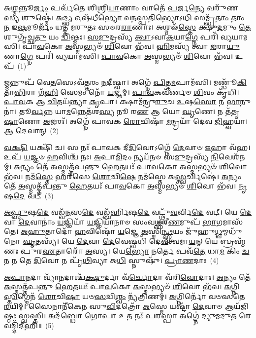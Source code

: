 \setcounter{anuvakam}{0}
𑌅\-\ul{𑌶𑍍𑌮}\-𑌨𑍍𑌨𑍂\-\ul{𑌰𑍍𑌜𑌂} 𑌪𑌰𑍍𑌵᳴𑌤𑍇 𑌶𑌿𑌶𑍍𑌰𑌿\-\ul{𑌯𑌾}\-𑌣𑌾𑌂 𑌵𑌾𑌤𑍇᳴ \ul{𑌪}\-𑌰𑍍𑌜\-\ul{𑌨𑍍𑌯𑍇} 𑌵𑌰𑍁᳴𑌣\-\ul{𑌸𑍍𑌯} 𑌶𑍁𑌷𑍍𑌮𑍇॑। \ul{𑌅}\-𑌦𑍍𑌭𑍍𑌯 𑌓𑌷᳴𑌧𑍀\-\ul{𑌭𑍍𑌯𑍋} 𑌵\-\ul{𑌨}\-𑌸𑍍𑌪\-\ul{𑌤𑌿}\-𑌭𑍍𑌯𑍋\-𑌽\-\ul{𑌧𑌿} 𑌸𑌮𑍍𑌭𑍃᳴\-\ul{𑌤𑌾𑌂} 𑌤𑌾𑌂 \ul{𑌨} 𑌇\-\ul{𑌷}\-𑌮𑍂𑌰𑍍𑌜𑌂᳴ 𑌧𑌤𑍍𑌤 𑌮𑌰𑍁𑌤𑌃 𑌸𑍞𑌰\-\ul{𑌰𑌾}\-𑌣𑌾𑌃। 𑌅𑌶𑍍𑌮𑍟᳴\-\ul{𑌸𑍍𑌤𑍇} 𑌕𑍍𑌷𑍁\-\ul{𑌦}\-𑌮𑍁𑌂 \ul{𑌤𑍇} 𑌶𑍁𑌗𑍃᳴𑌚𑍍𑌛\-\ul{𑌤𑍁} 𑌯𑌂 \ul{𑌦𑍍𑌵𑌿}\-𑌷𑍍𑌮𑌃। \ul{𑌸}\-\-\ul{𑌮𑍁}\-𑌦𑍍𑌰𑌸𑍍𑌯᳴ \ul{𑌤𑍍𑌵𑌾}\-\-𑌽𑌵𑌾\-\ul{𑌕}\-𑌯𑌾\-\ul{𑌗𑍍𑌨𑍇} 𑌪𑌰𑌿᳴ 𑌵𑍍𑌯𑌯𑌾𑌮𑌸𑌿। 𑌪𑌾\-\ul{𑌵}\-𑌕𑍋 \ul{𑌅}\-𑌸𑍍𑌮𑌭𑍍𑌯𑍞᳴ \ul{𑌶𑌿}\-𑌵𑍋 𑌭᳴𑌵। \ul{𑌹𑌿}\-𑌮𑌸𑍍𑌯᳴ 𑌤𑍍𑌵𑌾 \ul{𑌜}\-𑌰𑌾\-\ul{𑌯𑍁}\-𑌣𑌾\-\ul{𑌗𑍍𑌨𑍇} 𑌪𑌰𑌿᳴ 𑌵𑍍𑌯𑌯𑌾𑌮𑌸𑌿। \ul{𑌪𑌾}\-\-\ul{𑌵}\-𑌕𑍋 \ul{𑌅}\-𑌸𑍍𑌮𑌭𑍍𑌯𑍞᳴ \ul{𑌶𑌿}\-𑌵𑍋 𑌭᳴𑌵। 𑌉𑌪᳴~(1)

𑌜𑍍𑌮𑌨𑍍𑌨𑍁𑌪᳴ 𑌵𑍇\-\ul{𑌤}\-𑌸𑍇\-𑌽𑌵᳴𑌤𑍍𑌤𑌰𑌂 \ul{𑌨}\-𑌦𑍀𑌷𑍍𑌵𑌾। 𑌅𑌗𑍍𑌨𑍇᳴ \ul{𑌪𑌿}\-𑌤𑍍𑌤\-\ul{𑌮}\-𑌪𑌾𑌮᳴𑌸𑌿। 𑌮𑌣𑍍𑌡𑍂᳴\-\ul{𑌕𑌿} 𑌤𑌾\-\ul{𑌭𑌿}\-𑌰𑌾 𑌗᳴\-\ul{𑌹𑌿} 𑌸𑍇𑌮𑌂 𑌨𑍋᳴ \ul{𑌯}\-𑌜𑍍𑌞𑌮𑍍। \ul{𑌪𑌾}\-\-\ul{𑌵}\-𑌕𑌵᳴𑌰𑍍𑌣𑍞 \ul{𑌶𑌿}\-𑌵𑌂 𑌕𑍃᳴𑌧𑌿। \ul{𑌪𑌾}\-\-\ul{𑌵}\-𑌕 𑌆 \ul{𑌚𑌿}\-𑌤𑌯᳴𑌨𑍍𑌤𑍍𑌯𑌾 \ul{𑌕𑍃}\-𑌪𑌾। 𑌕𑍍𑌷𑌾𑌮᳴𑌨𑍍𑌰𑍁\-\ul{𑌰𑍁}\-𑌚 \ul{𑌉}\-𑌷\-\ul{𑌸𑍋} 𑌨 \ul{𑌭𑌾}\-𑌨𑍁𑌨𑌾॑। 𑌤𑍂\-\ul{𑌰𑍍𑌵}\-𑌨𑍍𑌨 𑌯𑌾\-\ul{𑌮}\-𑌨𑍍𑌨𑍇𑌤᳴𑌶\-\ul{𑌸𑍍𑌯} 𑌨𑍂 𑌰\-\ul{𑌣} 𑌆 𑌯𑍋 \ul{𑌘𑍃}\-𑌣𑍇। 𑌨 𑌤᳴𑌤𑍃\-\ul{𑌷𑌾}\-𑌣𑍋 \ul{𑌅}\-𑌜𑌰𑌃᳴। 𑌅𑌗𑍍𑌨𑍇᳴ 𑌪𑌾𑌵𑌕 \ul{𑌰𑍋}\-𑌚𑌿𑌷𑌾᳴ \ul{𑌮}\-𑌨𑍍𑌦𑍍𑌰𑌯𑌾᳴ 𑌦𑍇𑌵 \ul{𑌜𑌿}\-𑌹𑍍𑌵𑌯𑌾॑। 𑌆 \ul{𑌦𑍇}\-𑌵𑌾𑌨𑍍~(2)

\-\ul{𑌵}\-\-\ul{𑌕𑍍𑌷𑌿} 𑌯𑌕𑍍𑌷𑌿᳴ 𑌚। 𑌸 𑌨𑌃᳴ 𑌪𑌾𑌵𑌕 𑌦𑍀\-\ul{𑌦𑌿}\-𑌵𑍋\-𑌽𑌗𑍍𑌨𑍇᳴ \ul{𑌦𑍇}\-𑌵𑌾𑍞 \ul{𑌇}\-𑌹𑌾 𑌵᳴𑌹। 𑌉𑌪᳴ \ul{𑌯}\-𑌜𑍍𑌞𑍞 \ul{𑌹}\-𑌵𑌿𑌶𑍍𑌚᳴ 𑌨𑌃। \ul{𑌅}\-𑌪𑌾\-\ul{𑌮𑌿}\-𑌦𑌂 𑌨𑍍𑌯𑌯᳴𑌨𑍞 𑌸\-\ul{𑌮𑍁}\-𑌦𑍍𑌰𑌸𑍍𑌯᳴ \ul{𑌨𑌿}\-𑌵𑍇𑌶᳴𑌨𑌮𑍍। \ul{𑌅}\-𑌨𑍍𑌯𑌂 𑌤𑍇᳴ \ul{𑌅}\-𑌸𑍍𑌮𑌤𑍍𑌤᳴𑌪𑌨𑍍𑌤𑍁 \ul{𑌹𑍇}\-𑌤𑌯𑌃᳴ 𑌪𑌾\-\ul{𑌵}\-𑌕𑍋 \ul{𑌅}\-𑌸𑍍𑌮𑌭𑍍𑌯𑍞᳴ \ul{𑌶𑌿}\-𑌵𑍋 𑌭᳴𑌵। 𑌨𑌮᳴\-\ul{𑌸𑍍𑌤𑍇} 𑌹𑌰᳴𑌸𑍇 \ul{𑌶𑍋}\-𑌚𑌿\-\ul{𑌷𑍇} 𑌨𑌮᳴𑌸𑍍𑌤𑍇 𑌅\-\ul{𑌸𑍍𑌤𑍍𑌵}\-𑌰𑍍𑌚𑌿𑌷𑍇॑। \ul{𑌅}\-𑌨𑍍𑌯𑌂 𑌤𑍇᳴ \ul{𑌅}\-𑌸𑍍𑌮𑌤𑍍𑌤᳴𑌪𑌨𑍍𑌤𑍁 \ul{𑌹𑍇}\-𑌤𑌯𑌃᳴ 𑌪𑌾\-\ul{𑌵}\-𑌕𑍋 \ul{𑌅}\-𑌸𑍍𑌮𑌭𑍍𑌯𑍞᳴ \ul{𑌶𑌿}\-𑌵𑍋 𑌭᳴𑌵। \ul{𑌨𑍃}\-𑌷\-\ul{𑌦𑍇} 𑌵𑌟𑍍~(3)

\-\ul{𑌅}\-\-\ul{𑌫𑍍𑌸𑍁}\-𑌷\-\ul{𑌦𑍇} 𑌵𑌡𑍍𑌵᳴\-\ul{𑌨}\-𑌸\-\ul{𑌦𑍇} 𑌵𑌡𑍍𑌬᳴𑌰𑍍\mbox{}\-\ul{𑌹𑌿}\-𑌷\-\ul{𑌦𑍇} 𑌵𑌟𑍍𑌥𑍍𑌸𑍁᳴\-\ul{𑌵}\-𑌰𑍍𑌵𑌿\-\ul{𑌦𑍇} 𑌵𑌟𑍍। 𑌯𑍇 \ul{𑌦𑍇}\-𑌵𑌾 \ul{𑌦𑍇}\-𑌵𑌾𑌨𑌾𑌂॑ \ul{𑌯}\-𑌜𑍍𑌞𑌿𑌯𑌾᳴ \ul{𑌯}\-𑌜𑍍𑌞𑌿𑌯𑌾᳴𑌨𑌾𑍞 𑌸𑌂𑌵\-\ul{𑌥𑍍𑌸}\-𑌰𑍀\-\ul{𑌣}\-𑌮𑍁𑌪᳴ \ul{𑌭𑌾}\-𑌗𑌮𑌾𑌸᳴𑌤𑍇। \ul{𑌅}\-\-\ul{𑌹𑍁}\-𑌤𑌾𑌦𑍋᳴ \ul{𑌹}\-𑌵𑌿𑌷𑍋᳴ \ul{𑌯}\-𑌜𑍍𑌞𑍇 \ul{𑌅}\-𑌸𑍍𑌮𑌿\-\ul{𑌨𑍍𑌥𑍍𑌸𑍍𑌵}\-𑌯𑌂 𑌜𑍁᳴𑌹𑍁\-\ul{𑌧𑍍𑌵}\-𑌮𑍍𑌮𑌧𑍁᳴𑌨𑍋 \ul{𑌘𑍃}\-𑌤𑌸𑍍𑌯᳴। 𑌯𑍇 \ul{𑌦𑍇}\-𑌵𑌾 \ul{𑌦𑍇}\-𑌵𑍇𑌷𑍍𑌵𑌧𑌿᳴ 𑌦𑍇\-\ul{𑌵}\-𑌤𑍍𑌵𑌮𑌾\-\ul{𑌯}\-𑌨𑍍 𑌯𑍇 𑌬𑍍𑌰𑌹𑍍𑌮᳴𑌣𑌃 𑌪𑍁𑌰\-\ul{𑌏}\-𑌤𑌾𑌰𑍋᳴ \ul{𑌅}\-𑌸𑍍𑌯। 𑌯𑍇\-\ul{𑌭𑍍𑌯𑍋} 𑌨𑌰𑍍𑌤𑍇 𑌪𑌵᳴\-\ul{𑌤𑍇} 𑌧𑌾\-\ul{𑌮} 𑌕𑌿𑌂 \ul{𑌚}\-𑌨 𑌨 𑌤𑍇 \ul{𑌦𑌿}\-𑌵𑍋 𑌨 𑌪𑍃᳴\-\ul{𑌥𑌿}\-𑌵𑍍𑌯𑌾 𑌅\-\ul{𑌧𑌿} 𑌸𑍍𑌨𑍁𑌷𑍁᳴। \ul{𑌪𑍍𑌰𑌾}\-\-\ul{𑌣}\-𑌦𑌾𑌃~(4)

\-\ul{𑌅}\-\-\ul{𑌪𑌾}\-\-\ul{𑌨}\-𑌦𑌾 𑌵𑍍𑌯𑌾᳴\-\ul{𑌨}\-𑌦𑌾𑌶𑍍𑌚᳴\-\ul{𑌕𑍍𑌷𑍁}\-𑌰𑍍𑌦𑌾 𑌵᳴\-\ul{𑌰𑍍𑌚𑍋}\-𑌦𑌾 𑌵᳴𑌰𑌿\-\ul{𑌵𑍋}\-𑌦𑌾𑌃। \ul{𑌅}\-𑌨𑍍𑌯𑌂 𑌤𑍇᳴ \ul{𑌅}\-𑌸𑍍𑌮𑌤𑍍𑌤᳴𑌪𑌨𑍍𑌤𑍁 \ul{𑌹𑍇}\-𑌤𑌯𑌃᳴ 𑌪𑌾\-\ul{𑌵}\-𑌕𑍋 \ul{𑌅}\-𑌸𑍍𑌮𑌭𑍍𑌯𑍞᳴ \ul{𑌶𑌿}\-𑌵𑍋 𑌭᳴𑌵। \ul{𑌅}\-𑌗𑍍𑌨𑌿\-\ul{𑌸𑍍𑌤𑌿}\-𑌗𑍍𑌮𑍇𑌨᳴ \ul{𑌶𑍋}\-𑌚𑌿\-\ul{𑌷𑌾} 𑌯𑍞\-\ul{𑌸}\-𑌦𑍍𑌵𑌿\-\ul{𑌶𑍍𑌵𑌂} 𑌨𑍍𑌯᳴𑌤𑍍𑌰𑌿𑌣𑌮𑍍॑। \ul{𑌅}\-𑌗𑍍𑌨𑌿𑌰𑍍𑌨𑍋᳴ 𑌵𑍞𑌸𑌤𑍇 \ul{𑌰}\-𑌯𑌿𑌮𑍍। 𑌸𑍈𑌨𑌾𑌨𑍀᳴𑌕𑍇𑌨 𑌸𑍁\-\ul{𑌵𑌿}\-𑌦𑌤𑍍𑌰𑍋᳴ \ul{𑌅}\-𑌸𑍍𑌮𑍇 𑌯𑌷𑍍𑌟𑌾᳴ \ul{𑌦𑍇}\-𑌵𑌾𑍞 𑌆𑌯᳴𑌜𑌿𑌷𑍍𑌠𑌃 \ul{𑌸𑍍𑌵}\-𑌸𑍍𑌤𑌿। 𑌅𑌦᳴𑌬𑍍𑌧𑍋 \ul{𑌗𑍋}\-𑌪𑌾 \ul{𑌉}\-𑌤 𑌨𑌃᳴ 𑌪\-\ul{𑌰}\-𑌸𑍍𑌪𑌾 𑌅𑌗𑍍𑌨𑍇॑ \ul{𑌦𑍍𑌯𑍁}\-𑌮\-\ul{𑌦𑍁}\-𑌤 \ul{𑌰𑍇}\-𑌵𑌦𑍍𑌦𑌿᳴𑌦𑍀𑌹𑌿॥~(5)

